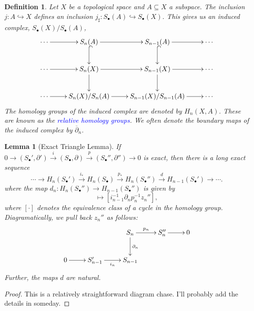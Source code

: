 \documentclass[10pt]{article}
\theoremstyle{thmstyle}
\newtheorem{lemma}[theorem]{Lemma}
\theoremstyle{defstyle}
\newtheorem{definition}[theorem]{Definition}
\newcommand{\into}{\hookrightarrow}
\newcommand{\define}[1]{\textcolor{blue}{\textit{#1}}}
\begin{document}
\begin{definition}
    Let $X$ be a topological space and $A\subseteq X$ a subspace. The inclusion $j: A\into X$ defines an inclusion $j_\sharp: S_\bullet(A)\into S_\bullet(X)$. This gives us an induced complex, $S_\bullet(X)/S_\bullet(A)$,
    \begin{equation*}
        \xymatrix {
        \cdots\ar[r] & S_n(A)\ar[r]\ar@{^{(}->}[d] & S_{n - 1}(A)\ar[r]\ar@{^{(}->}[d] & \cdots\\
        \cdots\ar[r] & S_n(X)\ar[r]\ar[d] & S_{n - 1}(X)\ar[r]\ar[d] & \cdots\\
        \cdots\ar[r] & S_n(X)/S_n(A)\ar[r] & S_{n - 1}(X)/S_{n - 1}(A)\ar[r] & \cdots\\
        }
    \end{equation*}
    The homology groups of the induced complex are denoted by $H_n(X, A)$. These are known as the \define{relative homology groups}. We often denote the boundary maps of the induced complex by $\overline\partial_n$.
\end{definition}

\begin{lemma}[Exact Triangle Lemma]
    If $0\to (S_\bullet', \partial')\stackrel{i}{\to} (S_\bullet, \partial)\stackrel{p}{\to} (S_\bullet'', \partial'')\to 0$ is exact, then there is a long exact sequence 
    \begin{equation*}
        \cdots\to H_n(S_\bullet')\stackrel{i_\ast}{\to} H_n(S_\bullet)\stackrel{p_\ast}{\to} H_n(S_\bullet'')\stackrel{d}{\to} H_{n - 1}(S_\bullet')\to\cdots.
    \end{equation*}
    where the map $d_n: H_n(S_\bullet'')\to H_{n - 1}(S_\bullet'')$ is given by 
    \begin{equation*}
        [z_n'']\mapsto \left[i_{n - 1}^{-1}\partial_np_n^{-1}z_n''\right],
    \end{equation*}
    where $[\cdot]$ denotes the equivalence class of a cycle in the homology group. Diagramatically, we pull back $z_n''$ as follows: 
    \begin{equation*}
        \xymatrix {
        & & S_n\ar[r]^{p_n}\ar[d]^{\partial_n} & S_n''\ar[r] & 0\\
        0\ar[r] & S_{n - 1}'\ar[r]_{i_n} & S_{n - 1} & & 
        }
    \end{equation*}
    Further, the maps $d$ are natural.
\end{lemma}
\begin{proof}
    This is a relatively straightforward diagram chase. I'll probably add the details in someday.
\end{proof}
\end{document}
